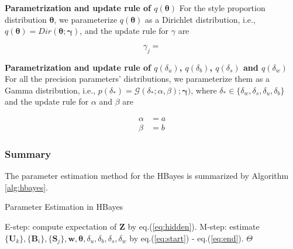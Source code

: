 \noindent \textbf{Parametrization and update rule of $q(\mathbf{\theta})$}
For the style proportion distribution $\mathbf{\theta}$, we parameterize $q(\mathbf{\theta})$ as a Dirichlet distribution, i.e., $q(\mathbf{\theta}) = Dir(\mathbf{\theta}; \mathbf{\gamma})$, and the update rule for $\gamma$ are 

\begin{equation}
\gamma_j =
\end{equation}



\noindent \textbf{Parametrization and update rule of $q(\delta_u)$, $q(\delta_b)$, $q(\delta_s)$ and $q(\delta_w)$}
For all the precision parameters' distributions, we parameterize them as a Gamma distribution, i.e., $p(\delta_*) = \mathcal{G}(\delta_*; \alpha, \beta); \mathbf{\gamma})$, where $\delta_* \in \{ \delta_w, \delta_s, \delta_u, \delta_b \}$ and the update rule for $\alpha$ and $\beta$ are 

\begin{align}
\alpha & = a\\ 
\beta & = b
\label{eq:end}
\end{align}












\subsubsection{Summary}
The parameter estimation method for the HBayes is summarized by Algorithm \ref{alg:hbayes}.

\begin{algorithm}
\caption{Parameter Estimation in HBayes}
\label{alg:hbayes}
\begin{algorithmic}[1]

\Repeat
\State E-step: compute expectation of $\mathbf{Z}$ by eq.(\ref{eq:hidden}).
\State M-step: estimate $\{\bm{U}_k\}, \{\bm{B}_i\}, \{\bm{S}_j\}, \bm{w}, \boldsymbol{\theta}, \delta_u,\delta_b,\delta_s,\delta_w$ by eq.(\ref{eq:start}) - eq.(\ref{eq:end}).
\State
\Return $\Theta$
\EndProcedure
\end{algorithmic}
\end{algorithm}

